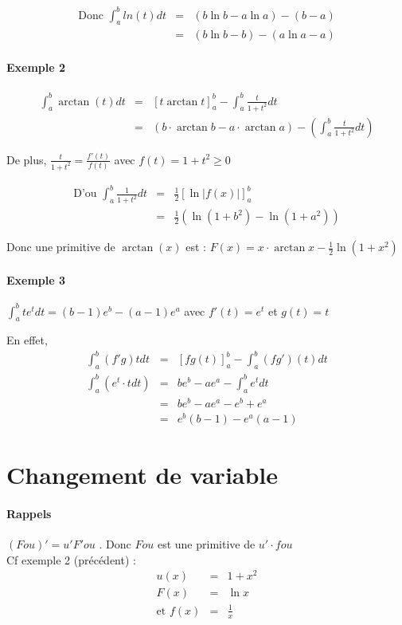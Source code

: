 		\[\begin{array}{rcl}
				\text{Donc } \int_a^b ln(t)dt &=& (b \ln b - a \ln a) - (b-a) \\
										  &=& (b \ln b - b) - (a \ln a - a) \end{array}\]

	\paragraph{Exemple 2} \[\begin{array}{rcl}
		\int_a^b \arctan(t)dt &=& [t \arctan t]^b_a - \int_a^b \frac{t}{1+t^2} dt \\
							&=& (b \cdot \arctan b -a \cdot \arctan a) - (\int_a^b \frac{t}{1+t^2} dt) \end{array}\]

		De plus, $\frac{t}{1+t^2} = \frac{f'(t)}{f(t)}$ avec $f(t) = 1+t^2 \geq 0$

		\[\begin{array}{rcl}
		\text{D'ou } \int_a^b \frac{1}{1+t^2} dt &=& \frac{1}{2}[\ln |f(x)|]^b_a \\
		  &=& \frac{1}{2} (\ln(1+b^2) - \ln(1+a^2)) \end{array}\]

		Donc une primitive de $\arctan(x)$ est : $F(x) = x \cdot \arctan x - \frac{1}{2}\ln(1+x^2)$

		\paragraph{Exemple 3} $\int_a^b te^t dt = (b-1)e^b - (a-1)e^a$ avec $f'(t) = e^t$ et $g(t) = t$

		En effet, \[\begin{array}{rcl}
				\int_a^b (f'g)t dt &=& [fg(t)]^b_a - \int_a^b (fg')(t)dt \\
				\int_a^b (e^t \cdot t dt) &=& b e^b - a e^a - \int_a^b e^t dt \\
									   &=& b e^b - a e^a - e^b + e^a \\
									   &=& e^b (b-1) - e^a (a-1)
		\end{array}\]

		\section{Changement de variable}

		\paragraph{Rappels} $(Fou)' = u'F'ou$ . Donc $Fou$ est une primitive de $u' \cdot fou$ ~\\
		Cf exemple 2 (précédent) : \[\begin{array}{rcl}
				u(x) &=& 1+x^2 \\
				F(x) &=& \ln x \\
		\text{et } f(x) &=& \frac{1}{x} \end{array}\]

